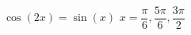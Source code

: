 { $\cos \left( 2x \right) = \sin \left( x \right)$}
{ $x = \dfrac{\pi}{6}, \dfrac{5\pi}{6}, \dfrac{3\pi}{2}$}
